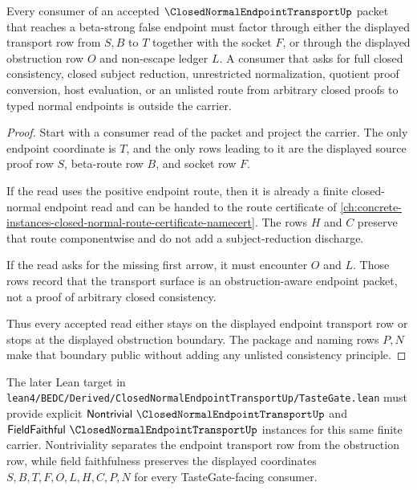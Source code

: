 \begin{theorem}
\label{thm:closed-normal-endpoint-transport-boundary}
Every consumer of an accepted $\ClosedNormalEndpointTransportUp$ packet that reaches a beta-strong false endpoint must factor through either the displayed transport row from $S,B$ to $T$ together with the socket $F$, or through the displayed obstruction row $O$ and non-escape ledger $L$. A consumer that asks for full closed consistency, closed subject reduction, unrestricted normalization, quotient proof conversion, host evaluation, or an unlisted route from arbitrary closed proofs to typed normal endpoints is outside the carrier.
\end{theorem}
\begin{proof}
Start with a consumer read of the packet and project the carrier. The only endpoint coordinate is $T$, and the only rows leading to it are the displayed source proof row $S$, beta-route row $B$, and socket row $F$.

If the read uses the positive endpoint route, then it is already a finite closed-normal endpoint read and can be handed to the route certificate of \autoref{ch:concrete-instances-closed-normal-route-certificate-namecert}. The rows $H$ and $C$ preserve that route componentwise and do not add a subject-reduction discharge.

If the read asks for the missing first arrow, it must encounter $O$ and $L$. Those rows record that the transport surface is an obstruction-aware endpoint packet, not a proof of arbitrary closed consistency.

Thus every accepted read either stays on the displayed endpoint transport row or stops at the displayed obstruction boundary. The package and naming rows $P,N$ make that boundary public without adding any unlisted consistency principle.
\end{proof}



The later Lean target in \texttt{lean4/BEDC/Derived/ClosedNormalEndpointTransportUp/TasteGate.lean} must provide explicit $\mathsf{Nontrivial}\ \ClosedNormalEndpointTransportUp$ and $\mathsf{FieldFaithful}\ \ClosedNormalEndpointTransportUp$ instances for this same finite carrier. Nontriviality separates the endpoint transport row from the obstruction row, while field faithfulness preserves the displayed coordinates $S,B,T,F,O,L,H,C,P,N$ for every TasteGate-facing consumer.

